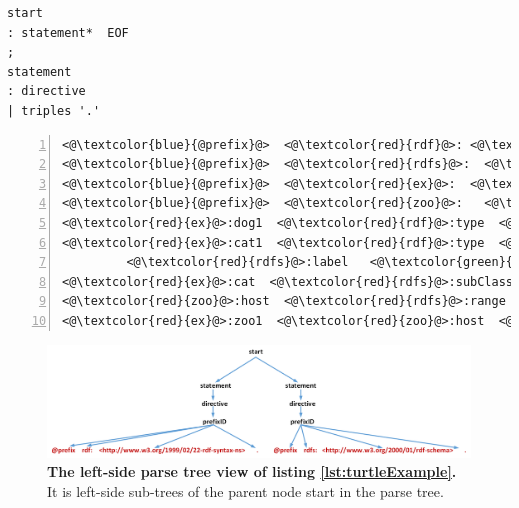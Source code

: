 \begin{lstlisting}[label=lst:startingRules, caption={Starting rules in the grammar file}] 
start
: statement*  EOF
;
statement
: directive
| triples '.'
\end{lstlisting}

\begin{lstlisting}[label=lst:turtleExample, numbers=left, caption={RDF example in Turtle serialization format}]
<@\textcolor{blue}{@prefix}@>  <@\textcolor{red}{rdf}@>: <@\textcolor{orange}{<http://www.w3.org/1999/02/22-rdf-syntax-ns\#>}@> .
<@\textcolor{blue}{@prefix}@>  <@\textcolor{red}{rdfs}@>:  <@\textcolor{orange}{<http://www.w3.org/2000/01/rdf-schema\#>}@> .
<@\textcolor{blue}{@prefix}@>  <@\textcolor{red}{ex}@>:  <@\textcolor{orange}{<http://example.org/>}@> .
<@\textcolor{blue}{@prefix}@>  <@\textcolor{red}{zoo}@>:   <@\textcolor{orange}{<http://example.org/zoo/> }@> .
<@\textcolor{red}{ex}@>:dog1  <@\textcolor{red}{rdf}@>:type  <@\textcolor{red}{ex}@>:animal .
<@\textcolor{red}{ex}@>:cat1  <@\textcolor{red}{rdf}@>:type  <@\textcolor{red}{ex}@>:cat ;
         <@\textcolor{red}{rdfs}@>:label   <@\textcolor{green}{"Lusi"@en}@> .
<@\textcolor{red}{ex}@>:cat  <@\textcolor{red}{rdfs}@>:subClassOf  <@\textcolor{red}{ex}@>:animal .
<@\textcolor{red}{zoo}@>:host  <@\textcolor{red}{rdfs}@>:range  <@\textcolor{red}{ex}@>:animal .
<@\textcolor{red}{ex}@>:zoo1  <@\textcolor{red}{zoo}@>:host  <@\textcolor{red}{ex}@>:cat2 .
\end{lstlisting}



\begin{figure}
		\centering\includegraphics[width=1.12\linewidth]{images/implementationParseTreeLeft.png}
		\caption{\textbf{The left-side parse tree view of listing \ref{lst:turtleExample}.} It is left-side sub-trees of the parent node start in the parse tree.}
	\label{Fig:implementationParseTreeLeft}
\end{figure}

